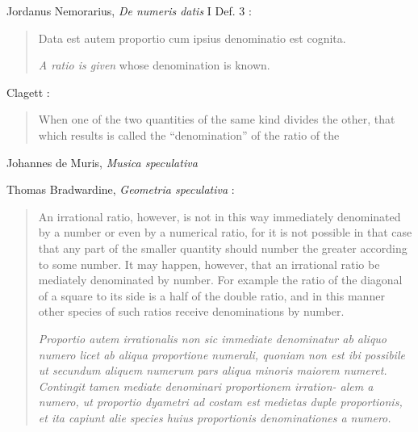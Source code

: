 \documentclass{article}
\begin{document}
Jordanus Nemorarius, {\em De numeris datis} I Def. 3 \cite[pp.~57, 127]{hughes}:

\begin{quote}
Data est autem proportio cum ipsius denominatio est cognita.

{\em A ratio is given} whose denomination is known.
\end{quote}












Clagett \cite[p.~22]{archimedes2}:

\begin{quote}
When one of the two quantities of the same kind divides the other,
that which results is called the ``denomination'' of the ratio of the
\end{quote}










Johannes de Muris, {\em Musica speculativa}










Thomas Bradwardine, {\em Geometria speculativa} \cite[p.~121]{molland}:

\begin{quote}
An irrational ratio, however, is not in this way immediately denominated by a number or even by a numerical ratio, for it is not possible in that case that any part of the smaller quantity should number the greater according to some number. It may happen, however, that an irrational ratio be mediately denominated by number. For example the ratio of the diagonal of a square to its side is a half of the double ratio, and in this manner other species of such ratios receive denominations by number.

{\em Proportio autem irrationalis non sic immediate denominatur ab aliquo numero licet ab aliqua proportione numerali, quoniam non est ibi possibile ut secundum aliquem numerum pars aliqua minoris maiorem numeret. Contingit tamen mediate denominari proportionem irration- alem a numero, ut proportio dyametri ad costam est medietas duple proportionis, et ita capiunt alie species huius proportionis denominationes a numero.}
\end{quote}
\end{document}
